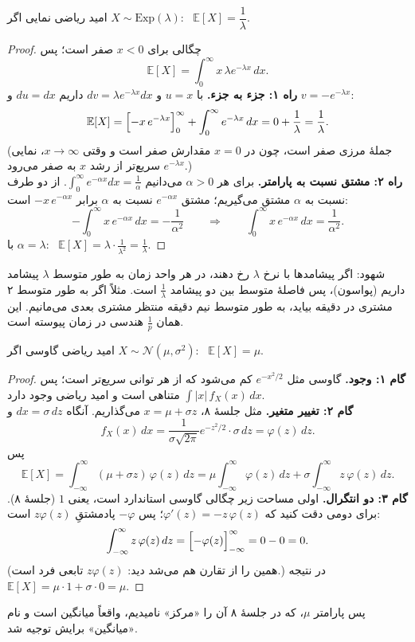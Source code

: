\begin{proposition}[label=prop:E-exp]{امید ریاضی نمایی}
  اگر $X\sim\mathrm{Exp}(\lambda)$: \ $\mathbb E[X]=\dfrac1\lambda$.
\end{proposition}
\begin{proof}
  چگالی برای $x<0$ صفر است؛ پس
  \[ \mathbb E[X]=\int_0^\infty x\,\lambda e^{-\lambda x}\,dx. \]
  \textbf{راه ۱: جزء به جزء.} با $u=x$ و $dv=\lambda e^{-\lambda x}dx$ داریم $du=dx$ و $v=-e^{-\lambda x}$:
  \[ \mathbb E[X]=\Bigl[-x\,e^{-\lambda x}\Bigr]_0^\infty+\int_0^\infty e^{-\lambda x}\,dx=0+\frac1\lambda=\frac1\lambda. \]
  (جملهٔ مرزی صفر است، چون در $x=0$ مقدارش صفر است و وقتی $x\to\infty$، نمایی $e^{-\lambda x}$ سریع‌تر از رشد $x$ به صفر می‌رود.)\\[3pt]
  \textbf{راه ۲: مشتق نسبت به پارامتر.} برای هر $\alpha>0$ می‌دانیم $\int_0^\infty e^{-\alpha x}dx=\frac1\alpha$. از دو طرف نسبت به $\alpha$ مشتق می‌گیریم؛ مشتق $e^{-\alpha x}$ نسبت به $\alpha$ برابر $-x\,e^{-\alpha x}$ است:
  \[ -\int_0^\infty x\,e^{-\alpha x}\,dx=-\frac{1}{\alpha^2}\qquad\Longrightarrow\qquad \int_0^\infty x\,e^{-\alpha x}\,dx=\frac{1}{\alpha^2}. \]
  با $\alpha=\lambda$: \ $\mathbb E[X]=\lambda\cdot\frac{1}{\lambda^2}=\frac1\lambda$.
\end{proof}
شهود: اگر پیشامدها با نرخ $\lambda$ رخ دهند، در هر واحد زمان به طور متوسط $\lambda$ پیشامد داریم (پواسون)، پس فاصلهٔ متوسط بین دو پیشامد $\frac1\lambda$ است. مثلاً اگر به طور متوسط ۲ مشتری در دقیقه بیاید، به طور متوسط نیم دقیقه منتظر مشتری بعدی می‌مانیم. این همان $\frac1p$ هندسی در زمان پیوسته است.

\begin{proposition}[label=prop:E-gauss]{امید ریاضی گاوسی}
  اگر $X\sim\mathcal N(\mu,\sigma^2)$: \ $\mathbb E[X]=\mu$.
\end{proposition}
\begin{proof}
  \textbf{گام ۱: وجود.}  گاوسی مثل $e^{-x^2/2}$ کم می‌شود که از هر توانی سریع‌تر است؛ پس $\int|x|\,f_X(x)\,dx$ متناهی است و امید ریاضی وجود دارد.\\
  \textbf{گام ۲: تغییر متغیر.} مثل جلسهٔ ۸، $x=\mu+\sigma z$ می‌گذاریم. آنگاه $dx=\sigma\,dz$ و
  \[ f_X(x)\,dx=\frac{1}{\sigma\sqrt{2\pi}}e^{-z^2/2}\cdot\sigma\,dz=\varphi(z)\,dz. \]
  پس
  \[ \mathbb E[X]=\int_{-\infty}^{\infty}(\mu+\sigma z)\,\varphi(z)\,dz=\mu\int_{-\infty}^{\infty}\varphi(z)\,dz+\sigma\int_{-\infty}^{\infty}z\,\varphi(z)\,dz. \]
  \textbf{گام ۳: دو انتگرال.} اولی مساحت زیر چگالی گاوسی استاندارد است، یعنی $1$ (جلسهٔ ۸). برای دومی دقت کنید که $\varphi'(z)=-z\,\varphi(z)$؛ پس $-\varphi$ پادمشتقِ $z\varphi(z)$ است:
  \[ \int_{-\infty}^{\infty}z\,\varphi(z)\,dz=\Bigl[-\varphi(z)\Bigr]_{-\infty}^{\infty}=0-0=0. \]
  (همین را از تقارن هم می‌شد دید: $z\varphi(z)$ تابعی فرد است.) در نتیجه $\mathbb E[X]=\mu\cdot1+\sigma\cdot0=\mu$.
\end{proof}
پس پارامتر $\mu$، که در جلسهٔ ۸ آن را «مرکز» نامیدیم، واقعاً میانگین است و نام «میانگین» برایش توجیه شد.

